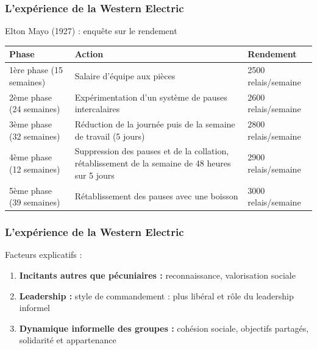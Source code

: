 \documentclass[12pt]{beamer}
\begin{document}
  \begin{frame}
    \frametitle{L'expérience de la Western Electric}
    
     Elton Mayo (1927) : enquête sur le rendement \bigskip
    
    \begin{tabular}{p{2.4cm}|p{6cm}|p{2cm}}
	Phase & Action & Rendement \\
	\hline \hline
	1ère phase (15 semaines) & Salaire d'équipe aux pièces & 2500 relais/semaine \\ \hline
	2ème phase (24 semaines) & Expérimentation d'un système de pauses intercalaires & 2600 relais/semaine \\ \hline
	3ème phase (32 semaines) & Réduction de la journée puis de la semaine de travail (5 jours) & 2800 relais/semaine \\ \hline
	4ème phase (12 semaines) & Suppression des pauses et de la collation, rétablissement de la semaine de 48 heures sur 5 jours & 2900 relais/semaine \\ \hline
	5ème phase (39 semaines) & Rétablissement des pauses avec une boisson & 3000 relais/semaine \\ \hline
    \end{tabular}
    
  \end{frame}
  
  \begin{frame}
      \frametitle{L'expérience de la Western Electric}
      
      Facteurs explicatifs :
      
      \begin{enumerate}
       \item \textbf{Incitants autres que pécuniaires :} reconnaissance, valorisation sociale
       \item \textbf{Leadership :} style de commandement : plus libéral et rôle du leadership informel
       \item \textbf{Dynamique informelle des groupes :} cohésion sociale, objectifs partagés, solidarité et appartenance
      \end{enumerate}
  \end{frame}
  
\end{document}
